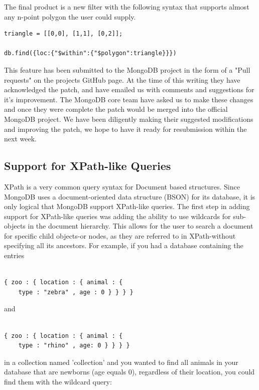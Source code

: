 \documentclass{../dependencies/acm_proc_article-sp}
\begin{document}
The final product is a new filter with the following syntax that supports 
almost any n-point polygon the user could supply.
\begin{lstlisting}
triangle = [[0,0], [1,1], [0,2]];

db.find({loc:{"$within":{"$polygon":triangle}}})
\end{lstlisting}


This feature has been submitted to the MongoDB project in the form
of a "Pull requests" on the projects GitHub page. \cite{4}
At the time of this writing they have acknowledged the patch, and have 
emailed us with comments and suggestions for it's improvement. The MongoDB core team have
asked us to make these changes and once they were complete the patch would be merged into 
the official MongoDB project. We have been diligently making their suggested modifications
and improving the patch, we hope to have it ready for resubmission within the next week.

\subsection{Support for XPath-like Queries}
XPath is a very common query syntax for Document based structures. Since MongoDB uses a document-oriented data structure (BSON) for its database, it is only logical that MongoDB support XPath-like queries. The first step in adding support for XPath-like queries was adding the ability to use wildcards for sub-objects in the document hierarchy. This allows for the user to search a document for specific child objects-or nodes, as they are referred to in XPath-without specifying all its ancestors. For example, if you had a database containing the entries

\begin{lstlisting}

{ zoo : { location : { animal : {
    type : "zebra" , age : 0 } } } }
\end{lstlisting}

and

\begin{lstlisting}

{ zoo : { location : { animal : {
    type : "rhino" , age: 0 } } } }
\end{lstlisting}

in a collection named 'collection' and you wanted to find all animals in your database that are newborns (age equals 0), regardless of their location, you could find them with the wildcard query:
\end{document}

